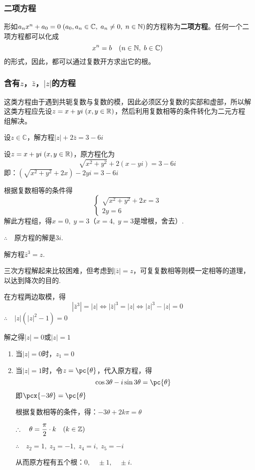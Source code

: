 \subsubsection{二项方程}
形如$a_nx^n+a_0=0\; (a_0,a_n\in\mathbb{C},\; a_n\ne 0,\; n\in\mathbb{N})$的方程称为\textbf{二项方程}。任何一个二项方程都可以化成
\[x^n=b\quad (n\in\mathbb{N},\; b\in\mathbb{C})\]
的形式，因此，都可以通过复数开方求出它的根。

\subsubsection{含有$z$，$\bar z$，$|z|$的方程}
这类方程由于遇到共轭复数与复数的模，因此必须区分复数的实部和虚部，所以解这类方程应先设$z=x+yi\; (x,y\in\mathbb{R})$，然后利用复数相等的条件转化为二元方程组解决。

\begin{example}
    设$z\in\mathbb{C}$，解方程$|z|+2\bar z=3-6i$
\end{example}

\begin{solution}
设$z=x+yi\; (x,y\in\mathbb{R})$，原方程化为
\[\sqrt{x^2+y^2}+2(x-yi)=3-6i\]
即：$\left(\sqrt{x^2+y^2}+2x\right)-2yi=3-6i$

根据复数相等的条件得
\[\begin{cases}
    \sqrt{x^2+y^2}+2x=3\\2y=6
\end{cases}\]
解此方程组，得$x=0,\; y=3$（$x=4,\; y=3$是增根，舍去）.

$\therefore\quad $原方程的解是$3i$.
\end{solution}

\begin{example}
    解方程$\bar z^3=z$.
\end{example}

\begin{analyze}
    三次方程解起来比较困难，但考虑到$|\bar z|=z$，可复复数相等则模一定相等的道理，以达到降次的目的.
\end{analyze}

\begin{solution}
在方程两边取模，得
\[|\bar z^3|=|z|\Leftrightarrow |\bar z|^3=|z|\Leftrightarrow |z|^3-|z|=0\]
$\therefore\quad |z|\left(|z|^2-1\right)=0$

解之得$|z|=0$或$|z|=1$

\begin{enumerate}
    \item 当$|z|=0$时，$z_1=0$
    \item 当$|z|=1$时，令$z=\pc{\theta}$，代入原方程，得
\[\cos3\theta-i\sin3\theta=\pc{\theta}\]
即$\pcx{-3\theta}=\pc{\theta}$

根据复数相等的条件，得：$-3\theta+2k\pi=\theta$

$\therefore\quad \theta=\dfrac{\pi}{2}\cdot k\quad (k\in\mathbb{Z})$

$\therefore\quad z_2=1,\; z_3=-1,\; z_4=i,\; z_5=-i$

从而原方程有五个根：$0,\quad \pm 1,\quad \pm i$.
\end{enumerate}
\end{solution}


